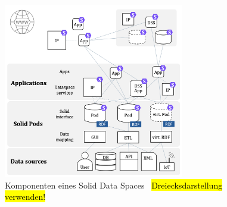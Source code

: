 \begin{figure}
    \centering
    \includegraphics[width=0.7\textwidth]{../shared/assets/meckler_sds_components.png}
    \caption{Komponenten eines Solid Data Spaces~\cite{mecklerWebLinkedData2023} \hl{Dreiecksdarstellung verwenden!}}
\end{figure}

